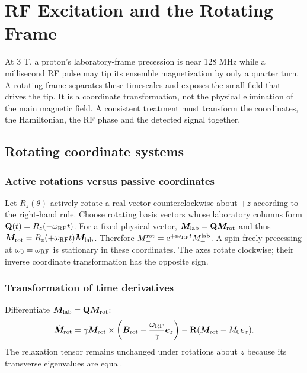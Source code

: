 \chapter{RF Excitation and the Rotating Frame}
\label{ch:04}

At 3 T, a proton's laboratory-frame precession is near 128 MHz while a
millisecond RF pulse may tip its ensemble magnetization by only a quarter
turn. A rotating frame separates these timescales and exposes the small
field that drives the tip. It is a coordinate transformation, not the
physical elimination of the main magnetic field.
A consistent treatment must transform the coordinates, the Hamiltonian,
the RF phase and the detected signal together.

\section{Rotating coordinate systems}
\label{sec:04:rotating-coordinate-systems}
\subsection{Active rotations versus passive coordinates}
Let $R_z(\theta)$ actively rotate a real vector counterclockwise about $+z$
according to the right-hand rule. Choose rotating basis vectors whose
laboratory columns form
$\mathbf{Q}(t)=R_z(-\omega_{\rm RF}t)$.
For a fixed physical vector,
$\bm{M}_{\rm lab}=\mathbf{Q}\bm{M}_{\rm rot}$ and thus
$\bm{M}_{\rm rot}=R_z(+\omega_{\rm RF}t)\bm{M}_{\rm lab}$.
Therefore
$M_+^{\rm rot}=\mathrm{e}^{+\mathrm{i}\omega_{\rm RF}t}M_+^{\rm lab}$.
A spin freely precessing at $\omega_0=\omega_{\rm RF}$ is stationary
in these coordinates. The axes rotate clockwise; their inverse
coordinate transformation has the opposite sign.

\subsection{Transformation of time derivatives}
Differentiate $\bm{M}_{\rm lab}=\mathbf{Q}\bm{M}_{\rm rot}$:
\[
 \dot{\bm{M}}_{\rm rot}
 =\gamma\bm{M}_{\rm rot}\times
    \left(\bm{B}_{\rm rot}-\frac{\omega_{\rm RF}}{\gamma}\bm{e}_z\right)
       -\mathbf{R}(\bm{M}_{\rm rot}-M_0\bm{e}_z).
\]
The relaxation tensor remains unchanged under rotations about $z$
because its transverse eigenvalues are equal.

